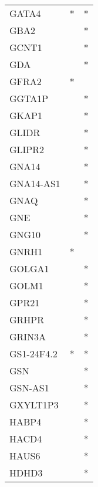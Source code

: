 \begin{longtable}{lcc}
GATA4                 &              * &          * \\
GBA2                  &                &          * \\
GCNT1                 &                &          * \\
GDA                   &                &          * \\
GFRA2                 &              * &            \\
GGTA1P                &                &          * \\
GKAP1                 &                &          * \\
GLIDR                 &                &          * \\
GLIPR2                &                &          * \\
GNA14                 &                &          * \\
GNA14-AS1             &                &          * \\
GNAQ                  &                &          * \\
GNE                   &                &          * \\
GNG10                 &                &          * \\
GNRH1                 &              * &            \\
GOLGA1                &                &          * \\
GOLM1                 &                &          * \\
GPR21                 &                &          * \\
GRHPR                 &                &          * \\
GRIN3A                &                &          * \\
GS1-24F4.2            &              * &          * \\
GSN                   &                &          * \\
GSN-AS1               &                &          * \\
GXYLT1P3              &                &          * \\
HABP4                 &                &          * \\
HACD4                 &                &          * \\
HAUS6                 &                &          * \\
HDHD3                 &                &          * \\

\end{longtable}
